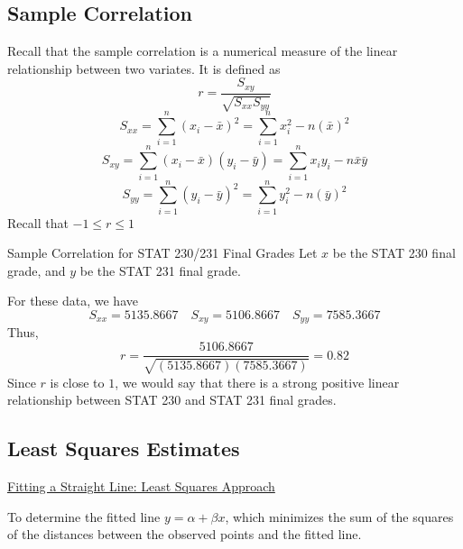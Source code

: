 \documentclass[oneside]{book}
\begin{document}
\subsection{Sample Correlation}
Recall that the sample correlation is a numerical measure of the linear relationship between two variates.
It is defined as
\[r=\frac{S_{x y}}{\sqrt{S_{x x} S_{y y}}}\]
\[S_{x x}=\sum_{i=1}^{n}\left(x_{i}-\bar{x}\right)^{2}=\sum_{i=1}^{n} x_{i}^{2}-n(\bar{x})^{2}\]
\[S_{x y}=\sum_{i=1}^{n}\left(x_{i}-\bar{x}\right)\left(y_{i}-\bar{y}\right)=\sum_{i=1}^{n} x_{i} y_{i}-n \bar{x} \bar{y}\]
\[S_{y y}=\sum_{i=1}^{n}\left(y_{i}-\bar{y}\right)^{2}=\sum_{i=1}^{n} y_{i}^{2}-n(\bar{y})^{2}\]
Recall that $ -1\leq r\leq 1 $

\begin{Example}{Sample Correlation for STAT 230/231 Final Grades}{}
    Let $ x $ be the STAT 230 final grade, and $ y $ be the STAT 231 final grade.

    For these data, we have
    \[S_{x x}=5135.8667 \quad S_{x y}=5106.8667 \quad S_{y y}=7585.3667\]
    Thus,
    \[r=\frac{5106.8667}{\sqrt{(5135.8667)(7585.3667)}}=0.82\]
    Since $ r $ is close to $ 1 $, we would say that there is a strong positive linear
    relationship between STAT 230 and STAT 231 final grades.
\end{Example}


\subsection{Least Squares Estimates}
\underline{Fitting a Straight Line: Least Squares Approach}

To determine the fitted line $ y=\alpha+\beta x $, which minimizes the sum of the squares
of the distances between the observed points and the fitted line.
\end{document}
